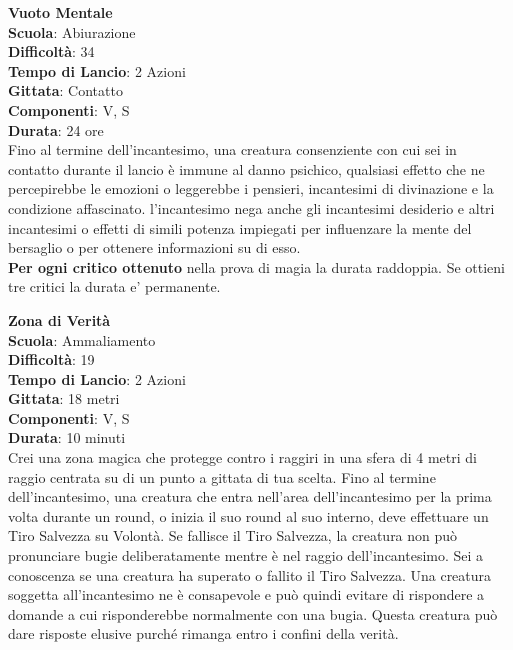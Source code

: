 \begin{multicols}{2}
\medskip\textbf{Vuoto Mentale}\\
\textbf{Scuola}: Abiurazione\\
\textbf{Difficoltà}: 34\\
\textbf{Tempo di Lancio}: 2 Azioni\\
\textbf{Gittata}: Contatto\\
\textbf{Componenti}: V, S\\
\textbf{Durata}: 24 ore\\
Fino al termine dell'incantesimo, una creatura consenziente con cui sei in contatto durante il lancio è immune al danno psichico, qualsiasi effetto che ne percepirebbe le emozioni o leggerebbe i pensieri, incantesimi di divinazione e la condizione affascinato. l'incantesimo nega anche gli incantesimi desiderio e altri incantesimi o effetti di simili potenza impiegati per
influenzare la mente del bersaglio o per ottenere informazioni su di esso.\\
\textbf{Per ogni critico ottenuto} nella prova di magia la durata raddoppia. Se ottieni tre critici la durata e' permanente.

\medskip\textbf{Zona di Verità}\\
\textbf{Scuola}: Ammaliamento\\
\textbf{Difficoltà}: 19\\
\textbf{Tempo di Lancio}: 2 Azioni\\
\textbf{Gittata}: 18 metri\\
\textbf{Componenti}: V, S\\
\textbf{Durata}: 10 minuti\\
Crei una zona magica che protegge contro i raggiri in una sfera di 4 metri di raggio centrata su di un punto a gittata di tua scelta. Fino al termine dell'incantesimo, una creatura che entra nell'area dell'incantesimo per la prima volta durante un round, o inizia il suo round al suo interno, deve effettuare un Tiro Salvezza su Volontà. Se fallisce il Tiro Salvezza, la creatura non può pronunciare bugie deliberatamente mentre è nel raggio dell'incantesimo. Sei a conoscenza se una creatura ha superato o fallito il Tiro Salvezza. Una creatura soggetta all'incantesimo ne è consapevole e può quindi evitare di rispondere a domande a cui risponderebbe normalmente con una bugia. Questa creatura può dare risposte elusive purché rimanga entro i confini della verità.

\end{multicols}

